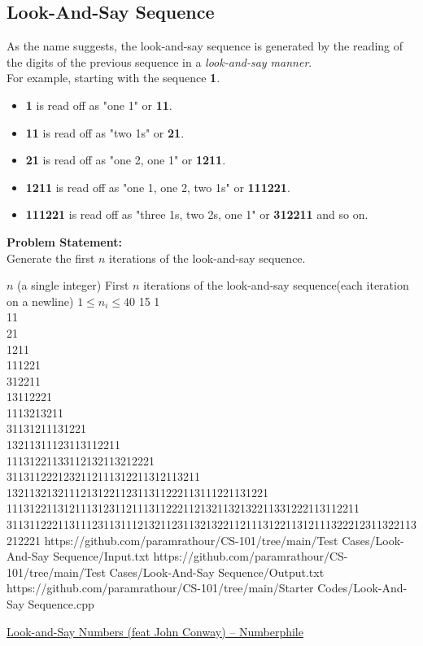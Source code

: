 \subsection{Look-And-Say Sequence}
As the name suggests, the look-and-say sequence is generated by the reading of the digits of the previous sequence in a \emph{look-and-say manner}.\\
For example, starting with the sequence \textbf{1}.
\begin{itemize}
\item \textbf{1} is read off as "one 1" or \textbf{11}.
\item \textbf{11} is read off as "two 1s" or \textbf{21}.
\item \textbf{21} is read off as "one 2, one 1" or \textbf{1211}.
\item \textbf{1211} is read off as "one 1, one 2, two 1s" or \textbf{111221}.
\item \textbf{111221} is read off as "three 1s, two 2s, one 1" or \textbf{312211} and so on.
\end{itemize}
\textbf{Problem Statement:}\\
Generate the first $n$ iterations of the look-and-say sequence.
\begin{testcasesMore}
	{$n$ \hfill(a single integer)}
	{First $n$ iterations of the look-and-say sequence\hfill(each iteration on a newline)}
	{$1 \leq n_i \leq 40$}
	{15}
	{1\\[0.5em]11\\[0.5em]21\\[0.5em]1211\\[0.5em]111221\\[0.5em]312211\\[0.5em]13112221\\[0.5em]1113213211\\[0.5em]31131211131221\\[0.5em]13211311123113112211\\[0.5em]11131221133112132113212221\\[0.5em]3113112221232112111312211312113211\\[0.5em]1321132132111213122112311311222113111221131221\\[0.5em]11131221131211131231121113112221121321132132211331222113112211\\[0.5em]311311222113111231131112132112311321322112111312211312111322212311322113212221}
	{https://github.com/paramrathour/CS-101/tree/main/Test Cases/Look-And-Say Sequence/Input.txt}
	{https://github.com/paramrathour/CS-101/tree/main/Test Cases/Look-And-Say Sequence/Output.txt}
	{https://github.com/paramrathour/CS-101/tree/main/Starter Codes/Look-And-Say Sequence.cpp}
\end{testcasesMore}
\begin{funvideo}
	\href{https://youtu.be/ea7lJkEhytA}{Look-and-Say Numbers (feat John Conway) -- Numberphile}
\end{funvideo}
\recalctypearea
